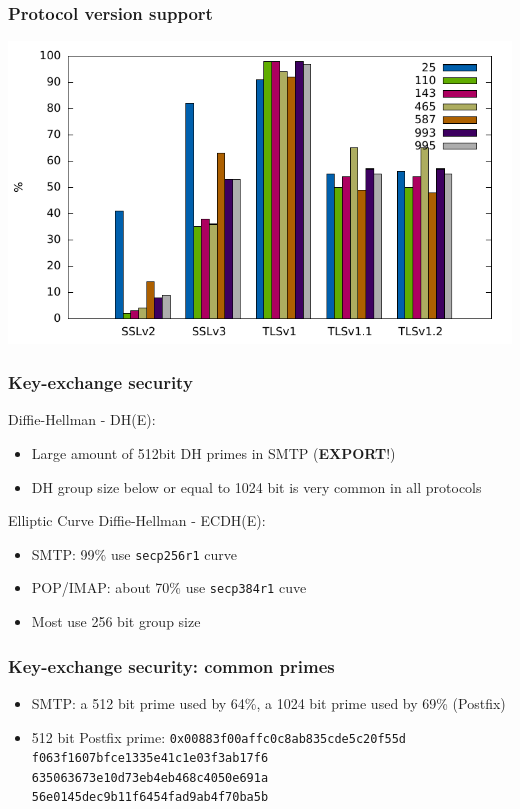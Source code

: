\documentclass[14pt,aspectratio=43]{beamer}
\begin{document}
\begin{frame}
  \frametitle{Protocol version support}
  \begin{center}
    \includegraphics*[scale=0.8]{images/plot-supported-protocols.pdf}
  \end{center}
\end{frame}

\begin{frame}
  \frametitle{Key-exchange security}
  Diffie-Hellman - DH(E):
  \begin{itemize}
    \item Large amount of 512bit DH primes in SMTP (\textbf{EXPORT}!)
    \item DH group size below or equal to 1024 bit is very common in all protocols
  \end{itemize}
  Elliptic Curve Diffie-Hellman - ECDH(E):
  \begin{itemize}
    \item SMTP: 99\% use \texttt{secp256r1} curve
    \item POP/IMAP: about 70\% use \texttt{secp384r1} cuve
    \item Most use 256 bit group size
  \end{itemize}
\end{frame}

\begin{frame}
  \frametitle{Key-exchange security: common primes}
  \begin{itemize}
    \item SMTP: a 512 bit prime used by 64\%, a 1024 bit prime used by 69\% (Postfix)
  \item 512 bit Postfix prime:
  \small
  \texttt{0x00883f00affc0c8ab835cde5c20f55d\\
          f063f1607bfce1335e41c1e03f3ab17f6\\
          635063673e10d73eb4eb468c4050e691a\\
          56e0145dec9b11f6454fad9ab4f70ba5b}\\
  \end{itemize}
\end{frame}
\end{document}
